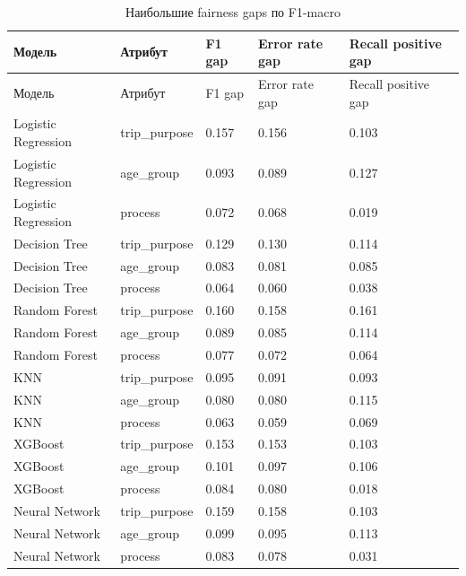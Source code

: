 \documentclass[14pt,a4paper]{extreport}
\begin{document}
\scriptsize
\begin{longtable}{lllll}
\caption{Наибольшие fairness gaps по F1-macro}\label{tab:fairness_gaps}\\
\toprule
Модель & Атрибут & F1 gap & Error rate gap & Recall positive gap \\
\midrule
\endfirsthead
\toprule
Модель & Атрибут & F1 gap & Error rate gap & Recall positive gap \\
\midrule
\endhead
Logistic Regression & trip\_purpose & 0.157 & 0.156 & 0.103 \\
Logistic Regression & age\_group & 0.093 & 0.089 & 0.127 \\
Logistic Regression & process & 0.072 & 0.068 & 0.019 \\
Decision Tree & trip\_purpose & 0.129 & 0.130 & 0.114 \\
Decision Tree & age\_group & 0.083 & 0.081 & 0.085 \\
Decision Tree & process & 0.064 & 0.060 & 0.038 \\
Random Forest & trip\_purpose & 0.160 & 0.158 & 0.161 \\
Random Forest & age\_group & 0.089 & 0.085 & 0.114 \\
Random Forest & process & 0.077 & 0.072 & 0.064 \\
KNN & trip\_purpose & 0.095 & 0.091 & 0.093 \\
KNN & age\_group & 0.080 & 0.080 & 0.115 \\
KNN & process & 0.063 & 0.059 & 0.069 \\
XGBoost & trip\_purpose & 0.153 & 0.153 & 0.103 \\
XGBoost & age\_group & 0.101 & 0.097 & 0.106 \\
XGBoost & process & 0.084 & 0.080 & 0.018 \\
Neural Network & trip\_purpose & 0.159 & 0.158 & 0.103 \\
Neural Network & age\_group & 0.099 & 0.095 & 0.113 \\
Neural Network & process & 0.083 & 0.078 & 0.031 \\
\bottomrule
\end{longtable}
\normalsize
\end{document}
